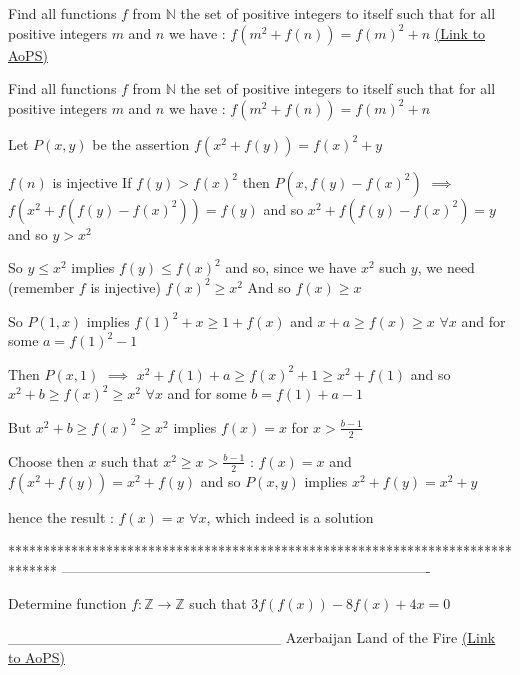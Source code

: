 \begin{problem}
	Find all functions $f$ from $\mathbb{N}$ the set of positive integers to itself such that for all positive integers $m$ and $n$ we have :
$f(m^2+f(n))=f(m)^2+n$
	\flushright \href{https://artofproblemsolving.com/community/c6h476037}{(Link to AoPS)}
\end{problem}



\begin{solution}
	\begin{tcolorbox}Find all functions $f$ from $\mathbb{N}$ the set of positive integers to itself such that for all positive integers $m$ and $n$ we have :
$f(m^2+f(n))=f(m)^2+n$\end{tcolorbox}
Let $P(x,y)$ be the assertion $f(x^2+f(y))=f(x)^2+y$

$f(n)$ is injective
If $f(y)>f(x)^2$ then $P(x,f(y)-f(x)^2)$ $\implies$ $f(x^2+f(f(y)-f(x)^2))=f(y)$ and so $x^2+f(f(y)-f(x)^2)=y$ and so $y>x^2$

So $y\le x^2$ implies $f(y)\le f(x)^2$ and so, since we have $x^2$ such $y$, we need (remember $f$ is injective) $f(x)^2\ge x^2$
And so $f(x)\ge x$

So $P(1,x)$ implies $f(1)^2+x\ge 1+f(x)$ and $x+a\ge f(x)\ge x$ $\forall x$ and for some $a=f(1)^2-1$

Then $P(x,1)$ $\implies$ $x^2+f(1)+a\ge f(x)^2+1\ge x^2+f(1)$ and so $x^2+b\ge f(x)^2\ge x^2$ $\forall x$ and for some $b=f(1)+a-1$

But $x^2+b\ge f(x)^2\ge x^2$ implies $f(x)=x$ for $x>\frac{b-1}2$

Choose then $x$ such that $x^2\ge x>\frac{b-1}2$ : $f(x)=x$ and $f(x^2+f(y))=x^2+f(y)$ and so $P(x,y)$ implies $x^2+f(y)=x^2+y$

 hence the result : $\boxed{f(x)=x}$ $\forall x$, which indeed is a solution
\end{solution}
*******************************************************************************
-------------------------------------------------------------------------------

\begin{problem}
	Determine function $f: \mathbb{Z}\to\mathbb{Z}$ such that $3f(f(x))-8f(x)+4x=0$


__________________________
Azerbaijan Land of the Fire 
	\flushright \href{https://artofproblemsolving.com/community/c6h476249}{(Link to AoPS)}
\end{problem}



